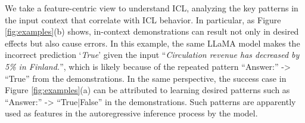 \documentclass{article} %
\def\jin#1{{\color{blue}{\bf [Xujin:} {{#1}}{\bf ]}}}
\begin{document}



We take a feature-centric view to understand ICL, analyzing the key patterns in the input context that correlate with ICL behavior. In particular, as Figure \ref{fig:examples}(b) shows, in-context demonstrations can result not only in desired effects but also cause errors. 
In this example, the same LLaMA model makes the incorrect prediction `\emph{True}' given the input ``\emph{Circulation revenue has decreased by 5\% in
Finland.}'', which is likely because of the repeated pattern ``Answer:'' -> ``True'' from the demonstrations. 
In the same perspective, the success case in Figure \ref{fig:examples}(a) can be attributed to learning desired patterns such as ``Answer:'' -> ``True|False'' in the demonstrations. 
Such patterns are apparently used as features in the autoregressive inference process by the model.
\end{document}
